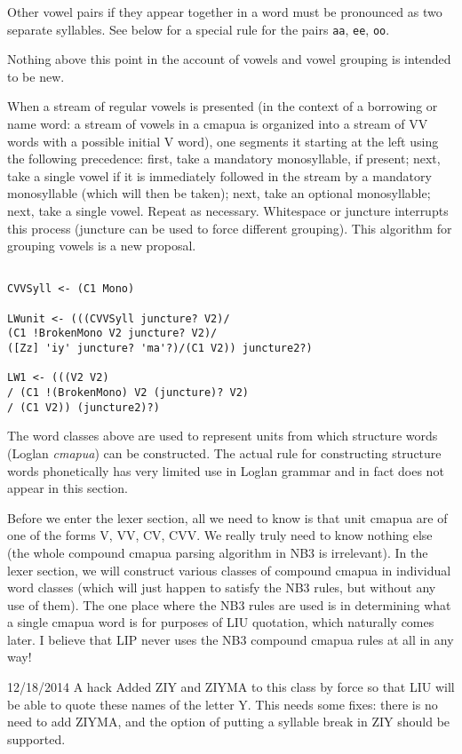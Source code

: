 \documentclass[12pt]{article}
\begin{document}
Other vowel pairs if they appear together in a word must be pronounced as two separate syllables.  See below for a special rule for the pairs {\tt aa}, {\tt ee}, {\tt oo}.

Nothing above this point in the account of vowels and vowel grouping is intended to be new.

When a stream of regular vowels is presented (in the context of a borrowing or name word:  a stream of vowels in a cmapua is organized into a stream of VV words with a possible initial V word), one segments it starting at the left using the following precedence:
first, take a mandatory monosyllable, if present; next, take a single vowel if it is immediately followed in the stream by a mandatory monosyllable (which will then be taken); next, take an optional monosyllable; next, take a single vowel.  Repeat as necessary.  Whitespace or juncture interrupts this process (juncture can be used to force different grouping).  This algorithm for grouping vowels is a new proposal.

\begin{verbatim}

CVVSyll <- (C1 Mono)

LWunit <- (((CVVSyll juncture? V2)/
(C1 !BrokenMono V2 juncture? V2)/
([Zz] 'iy' juncture? 'ma'?)/(C1 V2)) juncture2?)

LW1 <- (((V2 V2) 
/ (C1 !(BrokenMono) V2 (juncture)? V2) 
/ (C1 V2)) (juncture2)?)

\end{verbatim}

The word classes above are used to represent units from which structure words (Loglan {\em cmapua})
can be constructed.  The actual rule for constructing structure words phonetically has very limited use in Loglan
grammar and in fact does not appear in this section.

Before we enter the lexer section, all we need to know is that unit cmapua are of one of the forms
V, VV, CV, CVV.  We really truly need to know nothing else (the whole compound cmapua parsing algorithm in NB3 is irrelevant).  In the lexer section, we will construct various classes of compound cmapua in individual word classes
(which will just happen to satisfy the NB3 rules, but without any use of them).  The one place where the NB3 rules
are used is in determining what a single cmapua word is for purposes of LIU quotation, which naturally comes later.
I believe that LIP never uses the NB3 compound cmapua rules at all in any way!

12/18/2014  A hack   Added ZIY and ZIYMA to this class by force so that LIU will be able to quote these names of the letter Y.  This needs some
fixes:  there is no need to add ZIYMA, and the option of putting a syllable break in ZIY should be supported.
\end{document}
